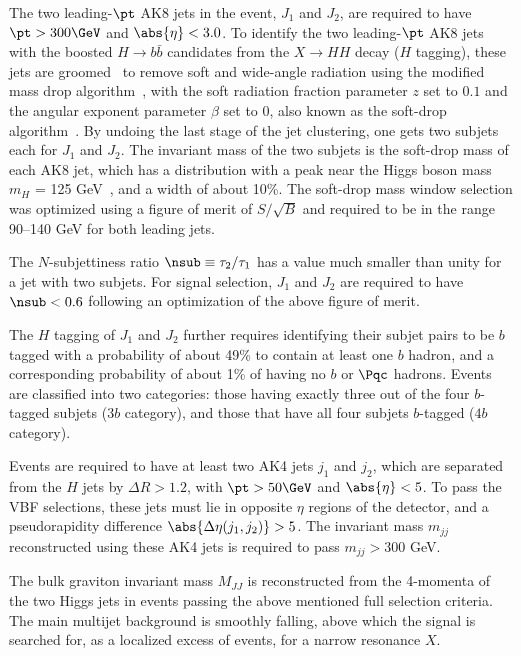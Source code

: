 The two leading-$\pt$ AK8 jets in the event, $J_{1}$ and $J_{2}$, are required to have $\pt > 300\GeV$ and  $\abs{\eta} < 3.0$. To identify the two leading-$\pt$ AK8 jets with the boosted $H\to b\bar{b}$ candidates from the $ X \to H  H $ decay ($ H $ tagging), these jets are groomed~\cite{Salam:2009jx} to remove soft and wide-angle radiation using the modified mass drop algorithm~\cite{Butterworth:2008iy,Dasgupta:2013ihk}, with the soft radiation fraction parameter $z$ set to $0.1$ and the angular exponent parameter $\beta$ set to 0, also known as the soft-drop algorithm~\cite{Larkoski:2014wba,CMS-PAS-JME-16-003}.
By undoing the last stage of the jet clustering, one gets two subjets each for $J_{1}$ and $J_{2}$.
The invariant mass of the two subjets is the soft-drop mass of each AK8 jet, which has a distribution with a peak near the Higgs boson mass $m_{H}$ = 125 GeV~\cite{Aad:2015zhl,Sirunyan:2017exp}, and a width of about 10\%.
The soft-drop mass window selection was optimized using a figure of merit of $S/\sqrt{B}$ and required to be in the range 90--140 GeV for both leading jets.

The $N$-subjettiness ratio $\nsub \equiv \tau_2/\tau_1$ has a value much smaller than unity for a jet with two subjets. For signal selection, $J_{1}$ and $J_{2}$ are required to have $\nsub < 0.6$ following an optimization of the above figure of merit.

The $ H $ tagging of $J_{1}$ and $J_{2}$ further requires identifying their subjet pairs to be $ b $ tagged with a probability of about 49\% to contain at least one $ b $ hadron, and a corresponding probability of about 1\% of having no $ b $ or $\Pqc$ hadrons. 
Events are classified into two categories: those having exactly three out of the four $ b $-tagged subjets ($3 b $ category), and those that have all four subjets $ b $-tagged ($4 b $ category).

Events are required to have at least two AK4 jets $j_{1}$ and $j_{2}$, which are separated from the $ H $ jets by $\Delta R> 1.2$, with $\pt > 50\GeV$ and $\abs{\eta}< 5$.
To pass the VBF selections, these jets must lie in opposite $\eta$ regions of the detector, and a pseudorapidity difference $\abs{\Delta\eta(j_{1}, j_{2})} > 5$.
The invariant mass $m_{jj}$ reconstructed using these AK4 jets is required to pass $m_{jj} > 300$ GeV.

The bulk graviton invariant mass $M_{JJ}$ is reconstructed from the 4-momenta of the two Higgs jets in events passing the above mentioned full selection criteria. The main multijet background is smoothly falling, above which the signal is searched for, as a localized excess of events, for a narrow resonance $X$. 

